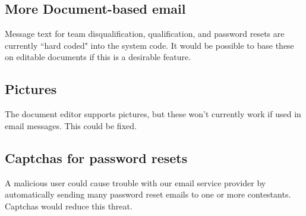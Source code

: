 \documentclass[11pt,letterpaper]{refart}
\begin{document}
\subsection{More Document-based email}
Message text for team disqualification, qualification, and password resets are currently
``hard coded" into the system code. It would be possible to base these on editable
documents if this is a desirable feature.

\subsection{Pictures}
The document editor supports pictures, but these won't currently work if used in email
messages.  This could be fixed.

\subsection{Captchas for password resets}
A malicious user could cause trouble with our email service provider by automatically
sending many password reset emails to one or more contestants. Captchas 
would reduce this threat.
\end{document}
